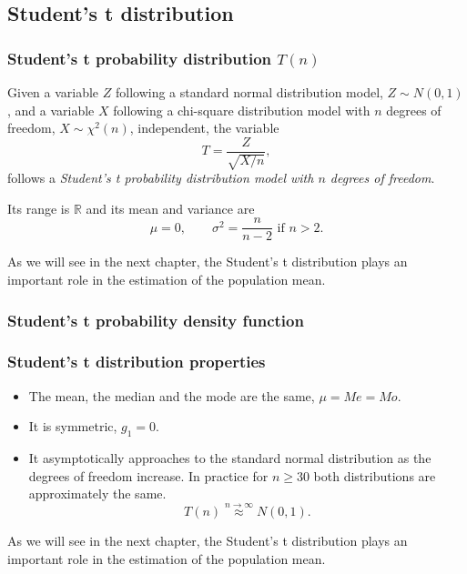 \subsection{Student's t distribution}

\begin{frame}
\frametitle{Student's t probability distribution $T(n)$}

\begin{definition}
Given a variable $Z$ following a standard normal distribution model, $Z\sim N(0,1)$, and a variable $X$ following a
chi-square distribution model with $n$ degrees of freedom, $X\sim \chi^2(n)$,  independent, the variable 
\[
T = \frac{Z}{\sqrt{X/n}},
\]
follows a \emph{Student's t probability distribution model with $n$ degrees of freedom}.
\end{definition}

Its range is $\mathbb{R}$ and its mean and variance are
\[
\mu = 0, \qquad \sigma^2 = \frac{n}{n-2} \mbox{ if $n>2$}.
\]

As we will see in the next chapter, the Student's t distribution plays an important role in the estimation of the population mean.
\end{frame}


\begin{frame}
\frametitle{Student's t probability density function}

\begin{center}
\end{center}
\end{frame}


\begin{frame}
\frametitle{Student's t distribution properties}
\begin{itemize}
\item The mean, the median and the mode are the same, $\mu=Me=Mo$.
\item It is symmetric, $g_1=0$.
\item It asymptotically approaches to the standard normal distribution as the degrees of freedom increase. 
In practice for $n\geq 30$ both distributions are approximately the same. 
\[
T(n)\stackrel{n\rightarrow \infty}{\approx}N(0,1).
\]
\end{itemize}
As we will see in the next chapter, the Student’s t distribution plays an important role in the estimation of the population mean.
\end{frame}


